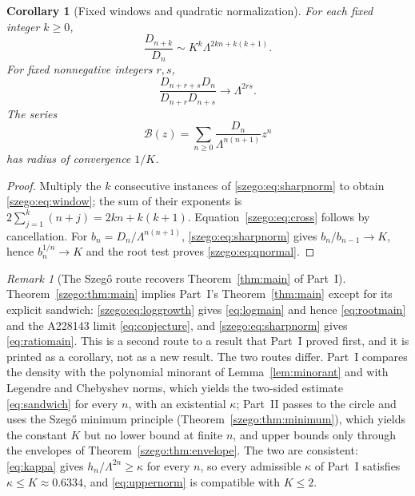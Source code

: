 \documentclass[11pt,a4paper]{article}
\numberwithin{equation}{section}
\newtheorem{corollary}[theorem]{Corollary}
\theoremstyle{remark}\newtheorem{remark}[theorem]{Remark}
\newcommand{\Lam}{\Lambda}
\begin{document}
\begin{corollary}[Fixed windows and quadratic normalization]\label{szego:cor:windows}
For each fixed integer $k\geq0$,
\begin{equation}\label{szego:eq:window}
 \frac{D_{n+k}}{D_n}\sim K^k\Lam^{2kn+k(k+1)}.
\end{equation}
For fixed nonnegative integers $r,s$,
\begin{equation}\label{szego:eq:cross}
 \frac{D_{n+r+s}D_n}{D_{n+r}D_{n+s}}\longrightarrow\Lam^{2rs}.
\end{equation}
The series
\begin{equation}\label{szego:eq:qnormal}
 \mathcal B(z)=\sum_{n\geq0}\frac{D_n}{\Lam^{n(n+1)}}z^n
\end{equation}
has radius of convergence $1/K$.
\end{corollary}
\begin{proof}
Multiply the $k$ consecutive instances of \eqref{szego:eq:sharpnorm} to obtain
\eqref{szego:eq:window}; the sum of their exponents is
$2\sum_{j=1}^k(n+j)=2kn+k(k+1)$.
Equation~\eqref{szego:eq:cross} follows by cancellation.
For $b_n=D_n/\Lam^{n(n+1)}$, \eqref{szego:eq:sharpnorm} gives
$b_n/b_{n-1}\to K$, hence $b_n^{1/n}\to K$ and the root test proves
\eqref{szego:eq:qnormal}.
\end{proof}

\begin{remark}[The Szeg\H{o} route recovers Theorem~\ref{thm:main} of Part~I]\label{szego:rem:partI}
Theorem~\ref{szego:thm:main} implies Part~I's Theorem~\ref{thm:main} except
for its explicit sandwich: \eqref{szego:eq:loggrowth} gives
\eqref{eq:logmain} and hence \eqref{eq:rootmain} and the A228143 limit
\eqref{eq:conjecture}, and \eqref{szego:eq:sharpnorm} gives
\eqref{eq:ratiomain}. This is a second route to a result that Part~I proved
first, and it is printed as a corollary, not as a new result. The two routes
differ. Part~I compares the density with the polynomial minorant of
Lemma~\ref{lem:minorant} and with Legendre and Chebyshev norms, which yields
the two-sided estimate \eqref{eq:sandwich} for every $n$, with an
existential $\kappa$; Part~II passes to the circle and uses the Szeg\H{o}
minimum principle (Theorem~\ref{szego:thm:minimum}), which yields the
constant $K$ but no lower bound at finite $n$, and upper bounds only
through the envelopes of Theorem~\ref{szego:thm:envelope}. The two are
consistent: \eqref{eq:kappa} gives $h_n/\Lambda^{2n}\geq\kappa$ for every $n$,
so every admissible $\kappa$ of Part~I satisfies $\kappa\leq K\approx0.6334$,
and \eqref{eq:uppernorm} is compatible with $K\leq2$.
\end{remark}
\end{document}
